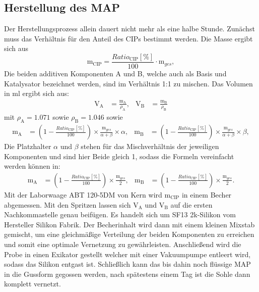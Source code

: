 \subsection{Herstellung des MAP} \FloatBarrier
Der Herstellungsprozess allein dauert nicht mehr als eine halbe Stunde. Zunächst muss das Verhältnis für den Anteil des CIPs bestimmt werden. Die Masse ergibt sich aus
\begin{equation}
\text{m}_{\text{CIP}} = \frac{Ratio_{\text{CIP}} [\%]}{100}\cdot\text{m}_{ges},
\end{equation}
Die beiden additiven Komponenten A und B, welche auch als Basis und Katalysator bezeichnet werden, sind im Verhältnis 1:1 zu mischen. Das Volumen in \unit{ml} ergibt sich aus:
\begin{align}
\text{V}_\text{A} &= \frac{\text{m}_\text{A}}{\rho_\text{A}} ,& 
\text{V}_\text{B} &= \frac{\text{m}_\text{B}}{\rho_\text{B}}
\end{align}
mit $\rho_\text{A} = 1.071$ sowie $\rho_\text{B} = 1.046$ sowie
\begin{align}	
\text{m}_\text{A} &= \left( 1- \frac{Ratio_{\text{CIP}} [\%]}{100}\right)\times
\frac{\text{m}_{ges}}{\alpha + \beta}\times\alpha ,&
\text{m}_\text{B} &= \left( 1- \frac{Ratio_{\text{CIP}} [\%]}{100}\right)\times
\frac{\text{m}_{ges}}{\alpha + \beta}\times\beta,
\end{align}
Die Platzhalter $\alpha$ und $\beta$ stehen für das Mischverhältnis der jeweiligen Komponenten und sind hier Beide gleich 1, sodass die Formeln vereinfacht werden können in:
\begin{align}	
\text{m}_\text{A} &= \left( 1- \frac{Ratio_{\text{CIP}} [\%]}{100}\right)\times
\frac{\text{m}_{ges}}{2} ,&
\text{m}_\text{B} &= \left( 1- \frac{Ratio_{\text{CIP}} [\%]}{100}\right)\times
\frac{\text{m}_{ges}}{2}.
\end{align}
Mit der Laborwaage ABT 120-5DM von Kern wird $\text{m}_\text{CIP}$ in einem Becher abgemessen. Mit den Spritzen lassen sich $\text{V}_\text{A}$ und $\text{V}_\text{B}$ auf die ersten Nachkommastelle genau beifügen. Es handelt sich um SF13 2k-Silikon vom Hersteller Silikon Fabrik. Der Becherinhalt wird dann mit einem kleinen Mixstab gemischt, um eine gleichmäßige Verteilung der beiden Komponenten zu erreichen und somit eine optimale Vernetzung zu gewährleisten. Anschließend wird die Probe in einen Exikator gestellt welcher mit einer Vakuumpumpe entleert wird, sodass das Silikon entgast ist. Schließlich kann das bis dahin noch flüssige MAP in die Gussform gegossen werden, nach spätestens einem Tag ist die Sohle dann komplett vernetzt. 

